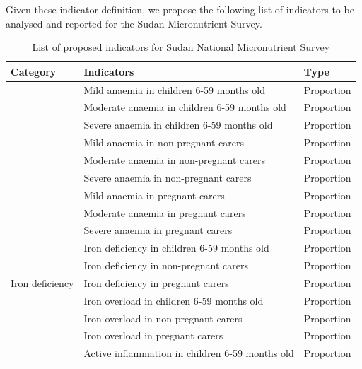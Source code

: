 \documentclass[12pt,a4paper]{article}
\begin{document}
Given these indicator definition, we propose the following list of indicators to be analysed and reported for the Sudan Micronutrient Survey.

\begin{table}[H]

\caption{\label{tab:indicators}List of proposed indicators for Sudan National Micronutrient Survey}
\centering
\begin{tabular}[t]{lll}
\toprule
\textbf{Category} & \textbf{Indicators} & \textbf{Type}\\
\midrule
\rowcolor{gray!6}   & Mild anaemia in children 6-59 months old & Proportion\\
\cmidrule{2-3}
 & Moderate anaemia in children 6-59 months old & Proportion\\
\cmidrule{2-3}
\rowcolor{gray!6}   & Severe anaemia in children 6-59 months old & Proportion\\
\cmidrule{2-3}
 & Mild anaemia in non-pregnant carers & Proportion\\
\cmidrule{2-3}
\rowcolor{gray!6}   & Moderate anaemia in non-pregnant carers & Proportion\\
\cmidrule{2-3}
 & Severe anaemia in non-pregnant carers & Proportion\\
\cmidrule{2-3}
\rowcolor{gray!6}   & Mild anaemia in pregnant carers & Proportion\\
\cmidrule{2-3}
 & Moderate anaemia in pregnant carers & Proportion\\
\cmidrule{2-3}
\rowcolor{gray!6}  \multirow[t]{-9}{*}{\raggedright\arraybackslash Anaemia} & Severe anaemia in pregnant carers & Proportion\\
\cmidrule{1-3}
 & Iron deficiency in children 6-59 months old & Proportion\\
\cmidrule{2-3}
\rowcolor{gray!6}   & Iron deficiency in non-pregnant carers & Proportion\\
\cmidrule{2-3}
\multirow[t]{-3}{*}{\raggedright\arraybackslash Iron deficiency} & Iron deficiency in pregnant carers & Proportion\\
\cmidrule{1-3}
\rowcolor{gray!6}   & Iron overload in children 6-59 months old & Proportion\\
\cmidrule{2-3}
 & Iron overload in non-pregnant carers & Proportion\\
\cmidrule{2-3}
\rowcolor{gray!6}  \multirow[t]{-3}{*}{\raggedright\arraybackslash Iron overload} & Iron overload in pregnant carers & Proportion\\
\cmidrule{1-3}
 & Active inflammation in children 6-59 months old & Proportion\\

\end{tabular}
\end{table}
\end{document}
